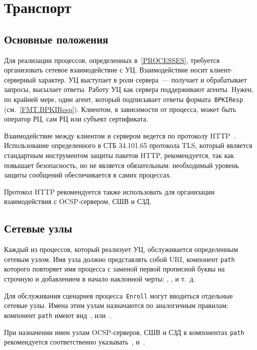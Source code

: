 \chapter{Транспорт}\label{TRANSPORT}

\section{Основные положения}\label{TRANSPORT.Common}

Для реализации процессов, определенных в~\ref{PROCESSES}, 
требуется организовать сетевое взаимодействие с УЦ. Взаимодействие носит 
клиент-серверный характер. 
%
УЦ выступает в роли сервера~--- 
получает и обрабатывает запросы, высылает ответы.
Работу УЦ как сервера поддерживают агенты.
Нужен, по крайней мере, один агент, который подписывает ответы 
формата~\texttt{BPKIResp} (см.~\ref{FMT.BPKIResp}).
%
Клиентом, в зависимости от процесса, может быть оператор РЦ, сам РЦ или 
субъект сертификата.

Взаимодействие между клиентом и сервером ведется по протоколу HTTP~\cite{HTTP}.
Использование определенного в СТБ 34.101.65 протокола TLS, который 
является стандартным инструментом защиты пакетов HTTP, рекомендуется, 
так как повышает безопасность, но не является обязательным:
необходимый уровень защиты сообщений обеспечивается в самих процессах. 

Протокол HTTP рекомендуется также использовать для организации 
взаимодействия с OCSP-сервером, СШВ и СЗД. 

\section{Сетевые узлы}\label{TRANSPORT.Endpoints}

Каждый из процессов, который реализует УЦ, обслуживается определенным 
сетевым узлом. Имя узла должно представлять собой URI, компонент 
\texttt{path} которого повторяет имя процесса с заменой первой прописной 
буквы на строчную и добавлением в начало наклонной черты: , 
,  и т.~д.

Для обслуживания сценариев процесса~\texttt{Enroll} могут вводиться 
отдельные сетевые узлы. Имена этим узлам назначаются по аналогичным 
правилам: компонент \texttt{path} имеют вид~, 
 или~.

При назначении имен узлам OCSP-серверов, СШВ и СЗД в компонентах  
\texttt{path} рекомендуется соответственно указывать~, 
 и~.

